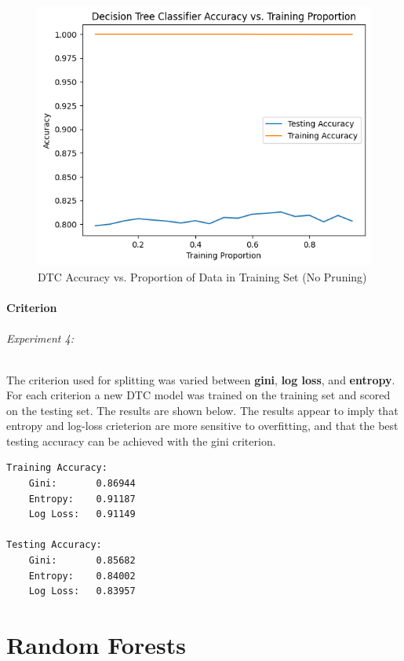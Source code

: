 \documentclass[12pt, letterpaper]{article}
\begin{document}
\begin{figure}
    \centering
    \includegraphics[width=\textwidth]{dt/dt8.png} %
    \caption{DTC Accuracy vs. Proportion of Data in Training Set (No Pruning)}
    \label{fig:dt4}
\end{figure}

\subsection{Criterion}
\paragraph*{Experiment 4:} The criterion used for splitting was varied between
\textbf{gini}, \textbf{log loss}, and \textbf{entropy}. For each criterion a
new DTC model was trained on the training set and scored on the testing set. 
The results are shown below. The results appear to imply that entropy and log-loss
crieterion are more sensitive to overfitting, and that the best testing accuracy
can be achieved with the gini criterion.

\begin{verbatim}
Training Accuracy:
    Gini:       0.86944
    Entropy:    0.91187
    Log Loss:   0.91149

Testing Accuracy:
    Gini:       0.85682
    Entropy:    0.84002
    Log Loss:   0.83957
\end{verbatim}

\part*{Random Forests}
\end{document}
